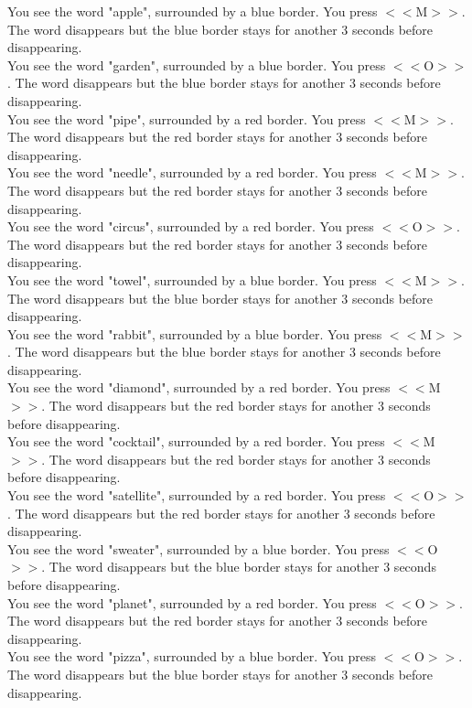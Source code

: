 \documentclass[pdflatex,sn-nature]{sn-jnl}%
\theoremstyle{thmstyleone}%
\theoremstyle{thmstyletwo}%
\theoremstyle{thmstylethree}%
\begin{document}
You see the word "apple", surrounded by a blue border. You press $<<$M$>>$. The word disappears but the blue border stays for another 3 seconds before disappearing. $~$\\ 
You see the word "garden", surrounded by a blue border. You press $<<$O$>>$. The word disappears but the blue border stays for another 3 seconds before disappearing. $~$\\ 
You see the word "pipe", surrounded by a red border. You press $<<$M$>>$. The word disappears but the red border stays for another 3 seconds before disappearing. $~$\\ 
You see the word "needle", surrounded by a red border. You press $<<$M$>>$. The word disappears but the red border stays for another 3 seconds before disappearing. $~$\\ 
You see the word "circus", surrounded by a red border. You press $<<$O$>>$. The word disappears but the red border stays for another 3 seconds before disappearing. $~$\\ 
You see the word "towel", surrounded by a blue border. You press $<<$M$>>$. The word disappears but the blue border stays for another 3 seconds before disappearing. $~$\\ 
You see the word "rabbit", surrounded by a blue border. You press $<<$M$>>$. The word disappears but the blue border stays for another 3 seconds before disappearing. $~$\\ 
You see the word "diamond", surrounded by a red border. You press $<<$M$>>$. The word disappears but the red border stays for another 3 seconds before disappearing. $~$\\ 
You see the word "cocktail", surrounded by a red border. You press $<<$M$>>$. The word disappears but the red border stays for another 3 seconds before disappearing. $~$\\ 
You see the word "satellite", surrounded by a red border. You press $<<$O$>>$. The word disappears but the red border stays for another 3 seconds before disappearing. $~$\\ 
You see the word "sweater", surrounded by a blue border. You press $<<$O$>>$. The word disappears but the blue border stays for another 3 seconds before disappearing. $~$\\ 
You see the word "planet", surrounded by a red border. You press $<<$O$>>$. The word disappears but the red border stays for another 3 seconds before disappearing. $~$\\ 
You see the word "pizza", surrounded by a blue border. You press $<<$O$>>$. The word disappears but the blue border stays for another 3 seconds before disappearing. $~$\\ 
\end{document}
